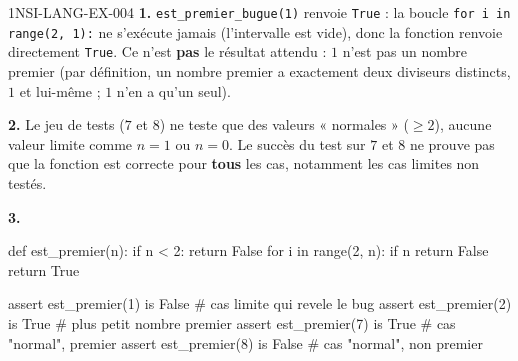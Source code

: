 \begin{corrige}{1NSI-LANG-EX-004}
\textbf{1.} \lstinline{est_premier_bugue(1)} renvoie \lstinline{True} : la boucle
\lstinline{for i in range(2, 1):} ne s'exécute jamais (l'intervalle est vide), donc la
fonction renvoie directement \lstinline{True}. Ce n'est \textbf{pas} le résultat attendu :
$1$ n'est pas un nombre premier (par définition, un nombre premier a exactement deux
diviseurs distincts, $1$ et lui-même ; $1$ n'en a qu'un seul).

\textbf{2.} Le jeu de tests ($7$ et $8$) ne teste que des valeurs « normales »
($\geqslant2$), aucune valeur limite comme $n=1$ ou $n=0$. Le succès du test sur $7$ et $8$
ne prouve pas que la fonction est correcte pour \textbf{tous} les cas, notamment les cas
limites non testés.

\textbf{3.}
\begin{python}
def est_premier(n):
    if n < 2:
        return False
    for i in range(2, n):
        if n %
            return False
    return True

assert est_premier(1) is False   # cas limite qui revele le bug
assert est_premier(2) is True    # plus petit nombre premier
assert est_premier(7) is True    # cas "normal", premier
assert est_premier(8) is False   # cas "normal", non premier
\end{python}
\end{corrige}
